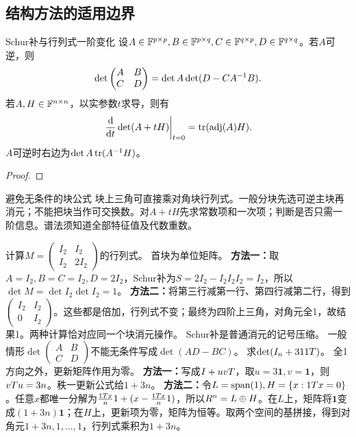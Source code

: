 \subsection{结构方法的适用边界}
\begin{theorem}{Schur补与行列式一阶变化}
设$A\in\mathbb{F}^{p\times p},B\in\mathbb{F}^{p\times q},C\in\mathbb{F}^{q\times p},D\in\mathbb{F}^{q\times q}$。若$A$可逆，则
\begin{equation}\det\begin{pmatrix}A&B\\C&D\end{pmatrix}=\det A\det(D-CA^{-1} B).\label{eq:schurdet}\end{equation}
若$A,H\in\mathbb{F}^{n\times n}$，以实参数$t$求导，则有
\begin{equation}\left.\dfrac{\mathrm d}{\mathrm dt}\det(A+tH)\right|_{t=0}=\operatorname{tr}(\operatorname{adj}(A)H).\label{eq:detderiv}\end{equation}
$A$可逆时右边为$\det A\operatorname{tr}(A^{-1} H)$。
\end{theorem}
\begin{proof}

\end{proof}
\begin{method}{避免无条件的块公式}
块上三角可直接乘对角块行列式。一般分块先选可逆主块再消元；不能把块当作可交换数。对$A+tH$先求常数项和一次项；判断是否只需一阶信息。谱法须知道全部特征值及代数重数。
\end{method}
{计算$M=\begin{pmatrix}I_2&I_2\\I_2&2I_2\end{pmatrix}$的行列式。}
{首块为单位矩阵。}
{\textbf{方法一：}取$A=I_2,B=C=I_2,D=2I_2$，Schur补为$S=2I_2-I_2I_2I_2=I_2$，所以$\det M=\det I_2\det I_2=1$。
\textbf{方法二：}将第三行减第一行、第四行减第二行，得到$\begin{pmatrix}I_2&I_2\\0&I_2\end{pmatrix}$。这些都是倍加，行列式不变；最终为四阶上三角，对角元全1，故结果1。两种计算恰对应同一个块消元操作。}
{Schur补是普通消元的记号压缩。}
{一般情形$\det\begin{pmatrix}A&B\\C&D\end{pmatrix}$不能无条件写成$\det(AD-BC)$。}
{求$\det(I_n+311T)$。}
{全1方向之外，更新矩阵作用为零。}
{\textbf{方法一：}写成$I+uvT$，取$u=3\bm1,v=\bm1$，则$vT u=3n$。秩一更新公式给$1+3n$。
\textbf{方法二：}令$L=\operatorname{span}(1),H=\{x:1T x=0\}$。任意$x$都唯一分解为$\frac{1T x}{n}1+(x-\frac{1T x}{n}1)$，所以$R^n=L\oplus H$。在$L$上，矩阵将$\bm1$变成$(1+3n)\bm1$；在$H$上，更新项为零，矩阵为恒等。取两个空间的基拼接，得到对角元$1+3n,1,\ldots,1$，行列式乘积为$1+3n$。}
